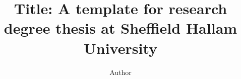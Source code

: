 \title{Title: A template for research degree thesis at Sheffield Hallam University}


\author{Author}








